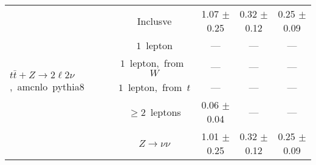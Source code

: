 \documentclass{article}
\begin{document}
\begin{longtable}{|l|c|c|c|c|}
\hline 
\multirow{6}{*}{$t\bar{t}+Z{\rightarrow}2{\ell}2{\nu}$,~amcnlo~pythia8} & Inclusve  & 1.07 $\pm$ 0.25  & 0.32 $\pm$ 0.12  & 0.25 $\pm$ 0.09 \\* 
 & $1$~lepton  & ---  & ---  & --- \\* 
 & $1$~lepton,~from~$W$  & ---  & ---  & --- \\* 
 & $1$~lepton,~from~$t$  & ---  & ---  & --- \\* 
 & $\ge2$~leptons  & 0.06 $\pm$ 0.04  & ---  & --- \\* 
 & $Z\rightarrow\nu\nu$  & 1.01 $\pm$ 0.25  & 0.32 $\pm$ 0.12  & 0.25 $\pm$ 0.09 \\* 
\hline 
\end{longtable} 

 
 
 
 
\pagebreak 

 
 
 
 
\end{document}
